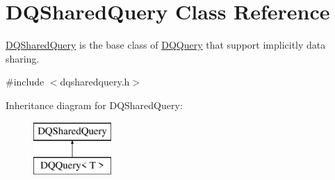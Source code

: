 \hypertarget{classDQSharedQuery}{
\section{DQSharedQuery Class Reference}
\label{classDQSharedQuery}
}


\hyperlink{classDQSharedQuery}{DQSharedQuery} is the base class of \hyperlink{classDQQuery}{DQQuery} that support implicitly data sharing.  




{\ttfamily \#include $<$dqsharedquery.h$>$}

Inheritance diagram for DQSharedQuery:\begin{figure}[H]
\begin{center}
\leavevmode
\includegraphics[height=2.000000cm]{classDQSharedQuery}
\end{center}
\end{figure}
